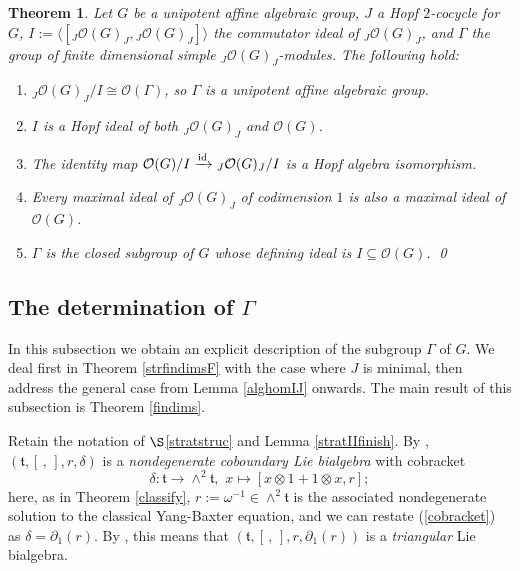 \documentclass{amsart}
\numberwithin{equation}{section}
\newtheorem{theorem}{Theorem}[section]
\theoremstyle{definition}
\begin{document}
\begin{theorem}\label{abel} 
Let $G$ be a unipotent affine algebraic group, $J$ a Hopf $2$-cocycle for $G$, $I:=\langle [{}_J\mathcal{O}(G)_J, {}_J\mathcal{O}(G)_J]\rangle$ the commutator ideal of ${}_J\mathcal{O}(G)_J$, and $\Gamma$ the group of finite dimensional simple ${}_J\mathcal{O}(G)_J$-modules. The following hold:
\begin{enumerate}
\item ${}_J\mathcal{O}(G)_J/I \cong \mathcal{O}(\Gamma)$, so $\Gamma$ is a unipotent affine algebraic group.
\item
$I$ is a Hopf ideal of both ${}_J\mathcal{O}(G)_J$ and $\mathcal{O}(G)$.
\item
The identity map $\mathcal{O}(G)/I\xrightarrow{{\rm id}} {}_J\mathcal{O}(G)_J/I$ is a Hopf algebra isomorphism.
\item
Every maximal ideal of ${}_J\mathcal{O}(G)_J$ of codimension $1$ is also a maximal ideal of $\mathcal{O}(G)$. 
\item
$\Gamma$ is the closed subgroup of $G$ whose defining ideal is $I\subseteq \mathcal{O}(G)$. \qed
\end{enumerate}
\end{theorem}

\subsection{The determination of $\Gamma$}\label{gamma} 
In this subsection we obtain an explicit description of the subgroup $\Gamma$ of $G$. We deal first in Theorem \ref{strfindimsF} with the case where $J$ is minimal, then address the general case from Lemma \ref{alghomIJ} onwards. The main result of this subsection is Theorem \ref{findims}.

Retain the notation of $\S$\ref{stratstruc} and Lemma \ref{stratIIfinish}. 
By \cite[Proposition 3.3 and Definition 3.2]{ES}, $(\mathfrak{t}, [\,,\,],r,\delta)$ is a \emph{nondegenerate coboundary Lie bialgebra} with cobracket 
\begin{equation}\label{cobracket}
\delta:\mathfrak{t}\to \wedge^2\mathfrak{t},\,\, x \mapsto [x\otimes 1+1\otimes x,r];
\end{equation} 
here, as in Theorem \ref{classify}, $r:=\omega^{-1}\in \wedge^2\mathfrak{t}$ is the associated nondegenerate solution to the classical Yang-Baxter equation, and we can restate (\ref{cobracket}) as $\delta = \partial_1(r)$. By \cite[Definitions 3.4]{ES}, this means that  $(\mathfrak{t}, [\,,\,],r,\partial_1(r))$ is a \emph{triangular} Lie bialgebra.
\end{document}
